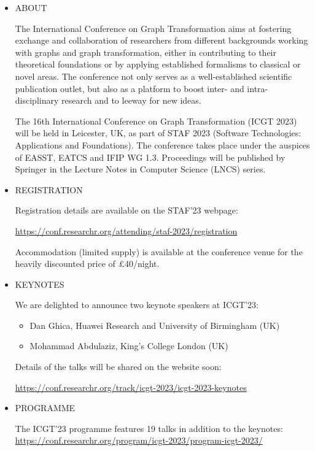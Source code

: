 \documentclass[prodmode,acmtecs]{acmsmall} %
\begin{document}
\begin{itemize}\item  ABOUT  
 
  The International Conference on Graph Transformation aims at fostering exchange and collaboration of researchers from different backgrounds working with graphs and graph transformation, either in contributing to their theoretical foundations or by applying established formalisms to classical or novel areas. The conference not only serves as a well-established scientific publication outlet, but also as a platform to boost inter- and intra-disciplinary research and to leeway for new ideas. 
 
  The 16th International Conference on Graph Transformation (ICGT 2023) will be held in Leicester, UK, as part of STAF 2023 (Software Technologies: Applications and Foundations). The conference takes place under the auspices of EASST, EATCS and IFIP WG 1.3. Proceedings will be published by Springer in the Lecture Notes in Computer Science (LNCS) series. 
 
\item  REGISTRATION 
 
  Registration details are available on the STAF'23 webpage: 
 
  \href{https://conf.researchr.org/attending/staf-2023/registration}{https://conf.researchr.org/attending/staf-2023/registration} 
 
  Accommodation (limited supply) is available at the conference venue for the heavily discounted price of £40/night. 
 
\item  KEYNOTES 
 
  We are delighted to announce two keynote speakers at ICGT'23: 
 
\begin{itemize}\item  Dan Ghica, Huawei Research and University of Birmingham (UK)
\item  Mohammad Abdulaziz, King’s College London (UK)
\end{itemize} 
  Details of the talks will be shared on the website soon: 
 
  \href{https://conf.researchr.org/track/icgt-2023/icgt-2023-keynotes}{https://conf.researchr.org/track/icgt-2023/icgt-2023-keynotes} 
 
\item  PROGRAMME  
 
  The ICGT'23 programme features 19 talks in addition to the keynotes: \href{https://conf.researchr.org/program/icgt-2023/program-icgt-2023/}{https://conf.researchr.org/program/icgt-2023/program-icgt-2023/} 
 

\end{itemize}
\end{document}
